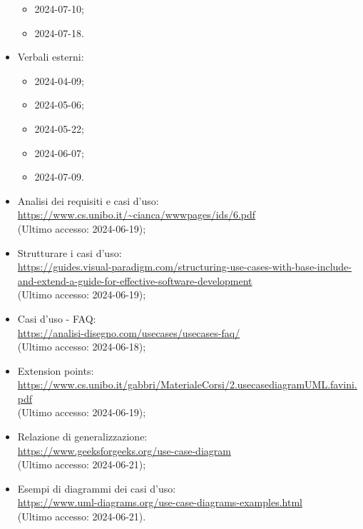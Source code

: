 \begin{itemize}
\begin{itemize}
    \item 2024-07-10;
    \item 2024-07-18.
  \end{itemize}
  \item Verbali esterni:
  \begin{itemize}
    \item 2024-04-09;
    \item 2024-05-06;
    \item 2024-05-22;
    \item 2024-06-07;
    \item 2024-07-09.
  \end{itemize}
  \item Analisi dei requisiti e casi d'uso:\\ \href{https://www.cs.unibo.it/~cianca/wwwpages/ids/6.pdf}{https://www.cs.unibo.it/\textasciitilde cianca/wwwpages/ids/6.pdf}  \\ (Ultimo accesso: 2024-06-19);
  \item Strutturare i casi d'uso:\\ \href{https://guides.visual-paradigm.com/structuring-use-cases-with-base-include-and-extend-a-guide-for-effective-software-development}{https://guides.visual-paradigm.com/structuring-use-cases-with-base-include-and-extend-a-guide-for-effective-software-development}  \\ (Ultimo accesso: 2024-06-19);
  \item Casi d'uso - FAQ:\\ \href{https://analisi-disegno.com/usecases/usecases-faq}{https://analisi-disegno.com/usecases/usecases-faq/}  \\ (Ultimo accesso: 2024-06-18);
  \item Extension points:\\ \href{https://www.cs.unibo.it/gabbri/MaterialeCorsi/2.usecasediagramUML.favini.pdf}{https://www.cs.unibo.it/gabbri/MaterialeCorsi/2.usecasediagramUML.favini.pdf}  \\ (Ultimo accesso: 2024-06-19);
  \item Relazione di generalizzazione:\\ \href{https://www.geeksforgeeks.org/use-case-diagram}{https://www.geeksforgeeks.org/use-case-diagram}  \\ (Ultimo accesso: 2024-06-21);
  \item Esempi di diagrammi dei casi d'uso:\\ \href{https://www.uml-diagrams.org/use-case-diagrams-examples.html}{https://www.uml-diagrams.org/use-case-diagrams-examples.html}  \\ (Ultimo accesso: 2024-06-21).
\end{itemize}
